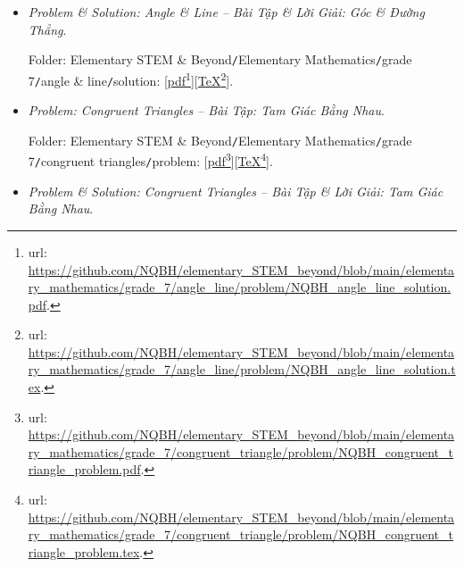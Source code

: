 \documentclass[12pt]{article}
\begin{document}
\begin{itemize}
	Folder: {\sf Elementary STEM \& Beyond{\tt/}Elementary Mathematics{\tt/}grade 7{\tt/}angle \& line{\tt/}problem}: [\href{https://github.com/NQBH/elementary_STEM_beyond/blob/main/elementary_mathematics/grade_7/angle_line/problem/NQBH_angle_line_problem.pdf}{pdf}\footnote{{\sc url}: \url{https://github.com/NQBH/elementary_STEM_beyond/blob/main/elementary_mathematics/grade_7/angle_line/problem/NQBH_angle_line_problem.pdf}.}][\href{https://github.com/NQBH/elementary_STEM_beyond/blob/main/elementary_mathematics/grade_7/angle_line/problem/NQBH_angle_line_problem.tex}{\TeX}\footnote{{\sc url}: \url{https://github.com/NQBH/elementary_STEM_beyond/blob/main/elementary_mathematics/grade_7/angle_line/problem/NQBH_angle_line_problem.tex}.}].
	\item {\it Problem \& Solution: Angle {\it\&} Line -- Bài Tập \& Lời Giải: Góc \& Đường Thẳng}.
	
	Folder: {\sf Elementary STEM \& Beyond{\tt/}Elementary Mathematics{\tt/}grade 7{\tt/}angle \& line{\tt/}solution}: [\href{https://github.com/NQBH/elementary_STEM_beyond/blob/main/elementary_mathematics/grade_7/angle_line/problem/NQBH_angle_line_solution.pdf}{pdf}\footnote{{\sc url}: \url{https://github.com/NQBH/elementary_STEM_beyond/blob/main/elementary_mathematics/grade_7/angle_line/problem/NQBH_angle_line_solution.pdf}.}][\href{https://github.com/NQBH/elementary_STEM_beyond/blob/main/elementary_mathematics/grade_7/angle_line/problem/NQBH_angle_line_solution.tex}{\TeX}\footnote{{\sc url}: \url{https://github.com/NQBH/elementary_STEM_beyond/blob/main/elementary_mathematics/grade_7/angle_line/problem/NQBH_angle_line_solution.tex}.}].
	\item {\it Problem: Congruent Triangles -- Bài Tập: Tam Giác Bằng Nhau}.
	
	Folder: {\sf Elementary STEM \& Beyond{\tt/}Elementary Mathematics{\tt/}grade 7{\tt/}congruent triangles{\tt/}problem}: [\href{https://github.com/NQBH/elementary_STEM_beyond/blob/main/elementary_mathematics/grade_7/congruent_triangle/problem/NQBH_congruent_triangle_problem.pdf}{pdf}\footnote{{\sc url}: \url{https://github.com/NQBH/elementary_STEM_beyond/blob/main/elementary_mathematics/grade_7/congruent_triangle/problem/NQBH_congruent_triangle_problem.pdf}.}][\href{https://github.com/NQBH/elementary_STEM_beyond/blob/main/elementary_mathematics/grade_7/congruent_triangle/problem/NQBH_congruent_triangle_problem.tex}{\TeX}\footnote{{\sc url}: \url{https://github.com/NQBH/elementary_STEM_beyond/blob/main/elementary_mathematics/grade_7/congruent_triangle/problem/NQBH_congruent_triangle_problem.tex}.}].
	\item {\it Problem \& Solution: Congruent Triangles -- Bài Tập \& Lời Giải: Tam Giác Bằng Nhau}.
	

\end{itemize}
\end{document}
